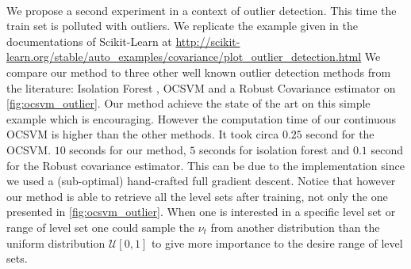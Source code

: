 \paragraph{}
We propose a second experiment in a context of outlier detection. This time 
the train set is polluted with outliers. We replicate the example given in
the documentations of Scikit-Learn at
\url{http://scikit-learn.org/stable/auto_examples/covariance/plot_outlier_detection.html}
We compare our method to three other well known outlier detection methods
from the literature: Isolation Forest \citep{Liu2008}, \acs{OCSVM}
\citep{Scholkopf2001} and a Robust Covariance estimator
\citep{campbell1980robust, pedregosa2011scikit} on \cref{fig:ocsvm_outlier}.
Our method achieve the state of the art on this simple example which is
encouraging. However the computation time of our continuous \acs{OCSVM} is
higher than the other methods. It took circa $0.25$ second for the \acs{OCSVM}.
$10$ seconds for our method, $5$ seconds for isolation forest and $0.1$ second
for the Robust covariance estimator. This can be due to the implementation since we used
a (sub-optimal) hand-crafted full gradient descent. Notice that however our
method is able to retrieve all the level sets after training, not only the one
presented in \cref{fig:ocsvm_outlier}.  When one is interested in a specific
level set or range of level set one could sample the $\nu_t$ from another
distribution than the uniform distribution $\mathcal{U}[0, 1]$ to give more
importance to the desire range of level sets.



